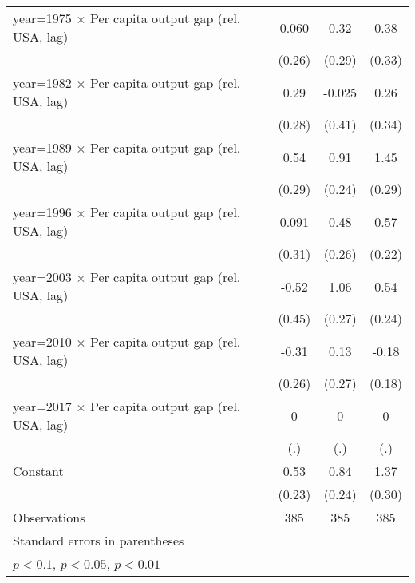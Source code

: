 {\begin{tabular}{l*{3}{c}}
\addlinespace
year=1975 $\times$ Per capita output gap (rel. USA, lag)&       0.060         &        0.32         &        0.38         \\
                    &      (0.26)         &      (0.29)         &      (0.33)         \\
\addlinespace
year=1982 $\times$ Per capita output gap (rel. USA, lag)&        0.29         &      -0.025         &        0.26         \\
                    &      (0.28)         &      (0.41)         &      (0.34)         \\
\addlinespace
year=1989 $\times$ Per capita output gap (rel. USA, lag)&        0.54\sym{*}  &        0.91\sym{***}&        1.45\sym{***}\\
                    &      (0.29)         &      (0.24)         &      (0.29)         \\
\addlinespace
year=1996 $\times$ Per capita output gap (rel. USA, lag)&       0.091         &        0.48\sym{*}  &        0.57\sym{**} \\
                    &      (0.31)         &      (0.26)         &      (0.22)         \\
\addlinespace
year=2003 $\times$ Per capita output gap (rel. USA, lag)&       -0.52         &        1.06\sym{***}&        0.54\sym{**} \\
                    &      (0.45)         &      (0.27)         &      (0.24)         \\
\addlinespace
year=2010 $\times$ Per capita output gap (rel. USA, lag)&       -0.31         &        0.13         &       -0.18         \\
                    &      (0.26)         &      (0.27)         &      (0.18)         \\
\addlinespace
year=2017 $\times$ Per capita output gap (rel. USA, lag)&           0         &           0         &           0         \\
                    &         (.)         &         (.)         &         (.)         \\
\addlinespace
Constant            &        0.53\sym{**} &        0.84\sym{***}&        1.37\sym{***}\\
                    &      (0.23)         &      (0.24)         &      (0.30)         \\
\midrule
Observations        &         385         &         385         &         385         \\
\bottomrule
\multicolumn{4}{l}{\footnotesize Standard errors in parentheses}\\
\multicolumn{4}{l}{\footnotesize \sym{*} \(p<0.1\), \sym{**} \(p<0.05\), \sym{***} \(p<0.01\)}\\
\end{tabular}
}
